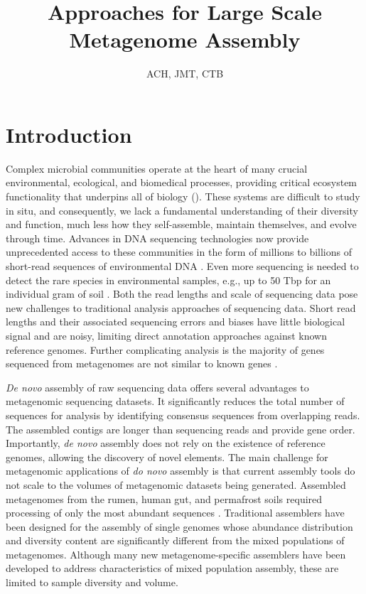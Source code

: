\documentclass[11pt]{article} %
\begin{document}
\title{Approaches for Large Scale Metagenome Assembly}
\author{ACH, JMT, CTB}
\maketitle

\section{Introduction}  
Complex microbial communities operate at the heart of many crucial environmental, ecological, and biomedical processes, providing critical ecosystem functionality that underpins all of biology (\cite{Arumugam:2011p735,Hess:2011p686,Iverson:2012p1281,Mackelprang:2011p1087,Qin:2010p189,Tringe:2005p174,Venter:2004p170}).  These systems are difficult to study in situ, and consequently, we lack a fundamental understanding of their diversity and function, much less how they self-assemble, maintain themselves, and evolve through time.  Advances in DNA sequencing technologies now provide unprecedented access to these communities in the form of millions to billions of short-read sequences of environmental DNA  \cite{Hess:2011p686,Mackelprang:2011p1087,Qin:2010p189}.   Even more sequencing is needed to detect the rare species in environmental samples, e.g., up to 50 Tbp for an individual gram of soil \cite{Gans:2005p1365}.   Both the read lengths and scale of sequencing data pose new challenges to traditional analysis approaches of sequencing data.  Short read lengths and their associated sequencing errors and biases have little biological signal and are noisy, limiting direct annotation approaches against known reference genomes.  Further complicating analysis is the majority of genes sequenced from metagenomes are not similar to known genes \cite{Arumugam:2011p735,Qin:2010p189}.  

\emph{De novo} assembly of raw sequencing data offers several advantages to metagenomic sequencing datasets.  It significantly reduces the total number of sequences for analysis by identifying consensus sequences from overlapping reads.  The assembled contigs are longer than sequencing reads and provide gene order.  Importantly, \emph{de novo} assembly does not rely on the existence of reference genomes, allowing the discovery of novel elements.   The main challenge for metagenomic applications of \emph{do novo} assembly is that current assembly tools do not scale to the volumes of metagenomic datasets being generated. Assembled metagenomes from the rumen, human gut, and permafrost soils required processing of only the most abundant sequences  \cite{Hess:2011p686,Mackelprang:2011p1087,Qin:2010p189}.  Traditional assemblers have been designed for the assembly of single genomes whose abundance distribution and diversity content are significantly different from the mixed populations of metagenomes.  Although many new metagenome-specific assemblers have been developed to address characteristics of mixed population assembly, these are limited to sample diversity and volume.    
\end{document}
